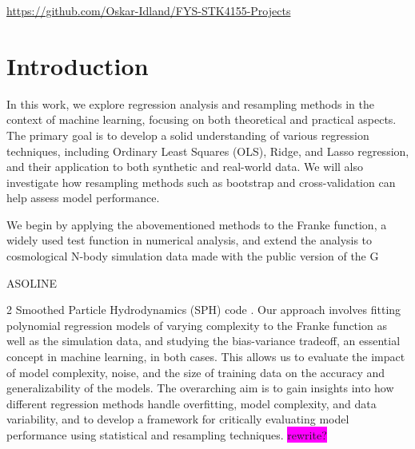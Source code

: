 \documentclass[aps,pra,english,notitlepage,reprint,nofootinbib]{revtex4-1}  %
\begin{document}
\maketitle
\onecolumngrid
\begin{center}
  \vspace{-15pt}
  \href{https://github.com/Oskar-Idland/FYS-STK4155-Projects}{https://github.com/Oskar-Idland/FYS-STK4155-Projects}%
  \vspace{5pt}
\end{center}
\twocolumngrid


\section{Introduction}\label{sec:introduction}
In this work, we explore regression analysis and resampling methods in the context of machine learning, focusing on both theoretical and practical aspects. The primary goal is to develop a solid understanding of various regression techniques, including Ordinary Least Squares (OLS), Ridge, and Lasso regression, and their application to both synthetic and real-world data. We will also investigate how resampling methods such as bootstrap and cross-validation can help assess model performance.

We begin by applying the abovementioned methods to the Franke function, a widely used test function in numerical analysis, and extend the analysis to cosmological N-body simulation data made with the public version of the G\begin{scriptsize}ASOLINE\end{scriptsize}2 Smoothed Particle Hydrodynamics (SPH) code \cite{gasoline}. Our approach involves fitting polynomial regression models of varying complexity to the Franke function as well as the simulation data, and studying the bias-variance tradeoff, an essential concept in machine learning, in both cases. This allows us to evaluate the impact of model complexity, noise, and the size of training data on the accuracy and generalizability of the models. The overarching aim is to gain insights into how different regression methods handle overfitting, model complexity, and data variability, and to develop a framework for critically evaluating model performance using statistical and resampling techniques. \colorbox{magenta}{rewrite?}
\end{document}
